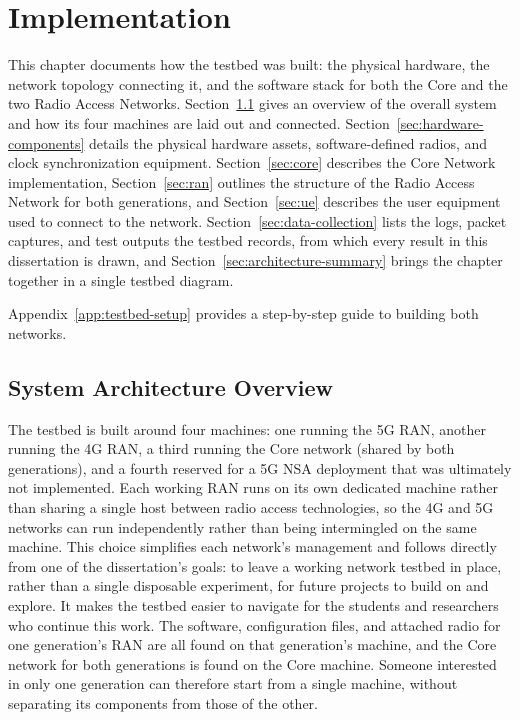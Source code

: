 %

\chapter{Implementation}
\label{cha:proposed-architecture}

This chapter documents how the testbed was built: the physical hardware, the network topology connecting it, and the software stack for both the Core and the two Radio Access Networks. Section~\ref{sec:system-overview} gives an overview of the overall system and how its four machines are laid out and connected. Section~\ref{sec:hardware-components} details the physical hardware assets, software-defined radios, and clock synchronization equipment. Section~\ref{sec:core} describes the Core Network implementation, Section~\ref{sec:ran} outlines the structure of the Radio Access Network for both generations, and Section~\ref{sec:ue} describes the user equipment used to connect to the network. Section~\ref{sec:data-collection} lists the logs, packet captures, and test outputs the testbed records, from which every result in this dissertation is drawn, and Section~\ref{sec:architecture-summary} brings the chapter together in a single testbed diagram.

Appendix~\ref{app:testbed-setup} provides a step-by-step guide to building both networks.

\section{System Architecture Overview}
\label{sec:system-overview}

The testbed is built around four machines: one running the 5G \gls{RAN}, another running the 4G \gls{RAN}, a third running the Core network (shared by both generations), and a fourth reserved for a 5G \gls{NSA} deployment that was ultimately not implemented. Each working \gls{RAN} runs on its own dedicated machine rather than sharing a single host between radio access technologies, so the 4G and 5G networks can run independently rather than being intermingled on the same machine. This choice simplifies each network's management and follows directly from one of the dissertation's goals: to leave a working network testbed in place, rather than a single disposable experiment, for future projects to build on and explore. It makes the testbed easier to navigate for the students and researchers who continue this work. The software, configuration files, and attached radio for one generation's \gls{RAN} are all found on that generation's machine, and the Core network for both generations is found on the Core machine. Someone interested in only one generation can therefore start from a single machine, without separating its components from those of the other.

